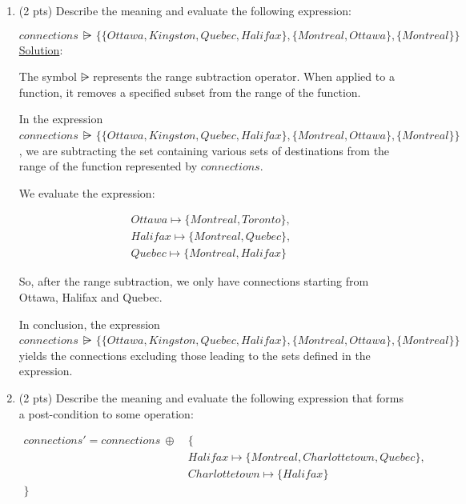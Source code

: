 \documentclass[12pt]{article}
\begin{document}
\begin{spacing}{1.5}
\begin{enumerate}
		\item (2 pts) Describe the meaning and evaluate the following expression:
		      		      
		      $$connections \: \rsub \: \{\{Ottawa, Kingston, Quebec, Halifax\},\{Montreal, Ottawa\},\{Montreal\}\}$$
		      \noindent \underline{Solution}:
		              
		      The symbol $\rsub$ represents the range subtraction operator. When applied to a function, it removes a specified subset from the range of the function.
		      		      
		      In the expression $connections \: \rsub \: \{\{Ottawa, Kingston, Quebec, Halifax\},\{Montreal, Ottawa\},\{Montreal\}\}$, we are subtracting the set containing various sets of destinations from the range of the function represented by $connections$.
		      		      
		      We evaluate the expression:
		      		      
		      \begin{align*}
		      	Ottawa \mapsto \{Montreal, Toronto\}, \\
		      	Halifax \mapsto \{Montreal, Quebec\}, \\
		      	Quebec \mapsto \{Montreal, Halifax\}  
		      \end{align*}
		      		      
		      So, after the range subtraction, we only have connections starting from Ottawa, Halifax and Quebec.
		      		      
		      In conclusion, the expression $connections \: \rsub \: \{\{Ottawa, Kingston, Quebec, Halifax\},\{Montreal, Ottawa\},\{Montreal\}\}$ yields the connections excluding those leading to the sets defined in the expression.
		      \newpage
		\item (2 pts) Describe the meaning and evaluate the following expression that forms a post-condition to some operation:
		      		      
		      \begin{align*}connections'=connections \: \oplus \: & \{  \\
		      	            & Halifax \mapsto \{Montreal, Charlottetown, Quebec\},             \\
		      	            & Charlottetown \mapsto \{Halifax\}                                \\
		      	\}          & \end{align*}                                            \newline 
		      	

\end{enumerate}
\end{spacing}
\end{document}
